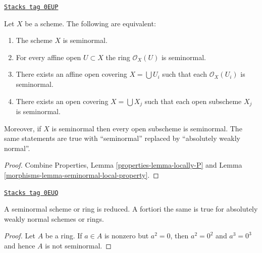 \begin{lemma}
\label{morphisms-lemma-locally-seminormal}
\href{https://stacks.math.columbia.edu/tag/0EUP}{\texttt{Stacks tag 0EUP}}

Let $X$ be a scheme. The following are equivalent:
\begin{enumerate}
\item The scheme $X$ is seminormal.
\item For every affine open $U \subset X$ the ring $\mathcal{O}_X(U)$
is seminormal.
\item There exists an affine open covering $X = \bigcup U_i$ such that
each $\mathcal{O}_X(U_i)$ is seminormal.
\item There exists an open covering $X = \bigcup X_j$
such that each open subscheme $X_j$ is seminormal.
\end{enumerate}
Moreover, if $X$ is seminormal
then every open subscheme is seminormal.
The same statements are true with ``seminormal'' replaced by
``absolutely weakly normal''.
\end{lemma}

\begin{proof}

Combine Properties, Lemma \ref{properties-lemma-locally-P} and
Lemma \ref{morphisms-lemma-seminormal-local-property}.
\end{proof}

\begin{lemma}
\label{morphisms-lemma-seminormal-reduced}
\href{https://stacks.math.columbia.edu/tag/0EUQ}{\texttt{Stacks tag 0EUQ}}

A seminormal scheme or ring is reduced. A fortiori the same
is true for absolutely weakly normal schemes or rings.
\end{lemma}

\begin{proof}
Let $A$ be a ring.
If $a \in A$ is nonzero but $a^2 = 0$, then $a^2 = 0^2$ and
$a^3 = 0^3$ and hence $A$ is not seminormal.
\end{proof}

